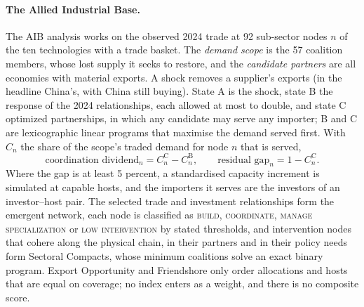 \paragraph{The Allied Industrial Base.} The AIB analysis works on the observed 2024 trade at 92
sub-sector nodes $n$ of the ten technologies with a trade basket. The \emph{demand scope} is the 57
coalition members, whose lost supply it seeks to restore, and the \emph{candidate partners} are all
economies with material exports. A shock removes a supplier's exports (in the headline China's, with
China still buying). State A is the shock, state B the response of the 2024 relationships, each
allowed at most to double, and state C optimized partnerships, in which any candidate may serve any
importer; B and C are lexicographic linear programs that maximise the demand served first. With
$C_n$ the share of the scope's traded demand for node $n$ that is served,
\begin{equation}\label{eq:fw_aib}
  \text{coordination dividend}_n=C^{\mathrm C}_n-C^{\mathrm B}_n,\qquad
  \text{residual gap}_n=1-C^{\mathrm C}_n .
\end{equation}
Where the gap is at least 5 percent, a standardised capacity increment is simulated at capable hosts,
and the importers it serves are the investors of an investor--host pair. The selected trade and
investment relationships form the emergent network, each node is classified as \textsc{build},
\textsc{coordinate}, \textsc{manage specialization} or \textsc{low intervention} by stated
thresholds, and intervention nodes that cohere along the physical chain, in their partners and in
their policy needs form Sectoral Compacts, whose minimum coalitions solve an exact binary program.
Export Opportunity and Friendshore only order allocations and hosts that are equal on coverage; no
index enters as a weight, and there is no composite score.

